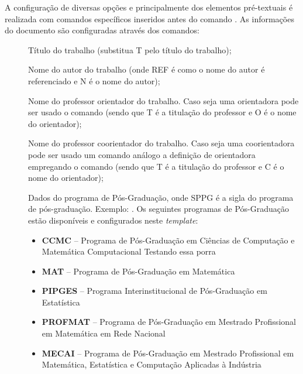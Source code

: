 A configuração de diversas opções e principalmente dos elementos pré-textuais é realizada com comandos específicos inseridos antes do comando . As informações do documento são configuradas através dos comandos:

\begin{description}

 \item[] Título do trabalho (substitua T pelo título do trabalho);

 \item[] Nome do autor do trabalho (onde REF é como o nome do autor é referenciado e N é o nome do autor);

 \item[] Nome do professor orientador do trabalho. Caso seja uma orientadora pode ser usado o comando  (sendo que T é a titulação do professor e O é o nome do orientador);

 \item[] Nome do professor coorientador do trabalho. Caso seja uma coorientadora pode ser usado um comando análogo a definição de orientadora  empregando o comando (sendo que T é a titulação do professor e C é o nome do orientador);

 
 \item[] Dados do programa de Pós-Graduação, onde SPPG é a sigla do programa de pós-graduação. Exemplo: . Os seguintes programas de Pós-Graduação estão disponíveis e configurados neste \textit{template}:
    \begin{itemize}
        \item \textbf{CCMC} -- Programa de Pós-Graduação em Ciências de Computação e Matemática Computacional Testando essa porra
        \item \textbf{MAT} -- Programa de Pós-Graduação em Matemática
        \item \textbf{PIPGES} -- Programa Interinstitucional de Pós-Graduação em Estatística
        \item \textbf{PROFMAT} -- Programa de Pós-Graduação em Mestrado Profissional em Matemática em Rede Nacional
        \item \textbf{MECAI} -- Programa de Pós-Graduação em Mestrado Profissional em Matemática, Estatística e Computação Aplicadas à Indústria
    \end{itemize}
 

\end{description}
